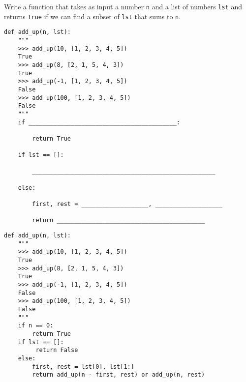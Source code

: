 \begin{blocksection}
\question Write a function that takes as input a number \texttt{n} and a list of numbers \texttt{lst} and returns \lstinline{True} if we can find a subset of \texttt{lst} that sums to \texttt{n}.

\ifprintanswers\else
\begin{lstlisting}
def add_up(n, lst):
    """ 
    >>> add_up(10, [1, 2, 3, 4, 5])
    True
    >>> add_up(8, [2, 1, 5, 4, 3])
    True
    >>> add_up(-1, [1, 2, 3, 4, 5])
    False
    >>> add_up(100, [1, 2, 3, 4, 5])
    False
    """
    if __________________________________________:
    
        return True
        
    if lst == []:
    
        ____________________________________________________
        
    else:
    
        first, rest = ___________________, ___________________
        
        return __________________________________________
\end{lstlisting}
\fi

\begin{solution}
\begin{lstlisting}
def add_up(n, lst):
    """ 
    >>> add_up(10, [1, 2, 3, 4, 5])
    True
    >>> add_up(8, [2, 1, 5, 4, 3])
    True
    >>> add_up(-1, [1, 2, 3, 4, 5])
    False
    >>> add_up(100, [1, 2, 3, 4, 5])
    False
    """
    if n == 0:
        return True
    if lst == []:
         return False  
    else:
        first, rest = lst[0], lst[1:]
        return add_up(n - first, rest) or add_up(n, rest)

\end{lstlisting}
\end{solution}
\end{blocksection}
